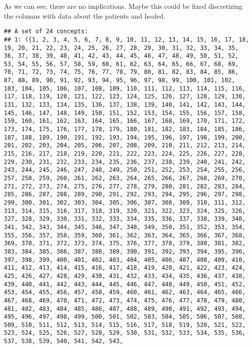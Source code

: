 \documentclass[
]{book}
\newenvironment{Shaded}{\begin{snugshade}}{\end{snugshade}}
\newcommand{\KeywordTok}[1]{\textcolor[rgb]{0.13,0.29,0.53}{\textbf{#1}}}
\newcommand{\NormalTok}[1]{#1}
\newcommand{\OperatorTok}[1]{\textcolor[rgb]{0.81,0.36,0.00}{\textbf{#1}}}
\begin{document}
As we can see, there are no implications. Maybe this could be fixed discretizing the columns with data about the patients and healed.

\begin{Shaded}
\end{Shaded}

\begin{verbatim}
## A set of 24 concepts:
## 1: ({1, 2, 3, 4, 5, 6, 7, 8, 9, 10, 11, 12, 13, 14, 15, 16, 17, 18, 19, 20, 21, 22, 23, 24, 25, 26, 27, 28, 29, 30, 31, 32, 33, 34, 35, 36, 37, 38, 39, 40, 41, 42, 43, 44, 45, 46, 47, 48, 49, 50, 51, 52, 53, 54, 55, 56, 57, 58, 59, 60, 61, 62, 63, 64, 65, 66, 67, 68, 69, 70, 71, 72, 73, 74, 75, 76, 77, 78, 79, 80, 81, 82, 83, 84, 85, 86, 87, 88, 89, 90, 91, 92, 93, 94, 95, 96, 97, 98, 99, 100, 101, 102, 103, 104, 105, 106, 107, 108, 109, 110, 111, 112, 113, 114, 115, 116, 117, 118, 119, 120, 121, 122, 123, 124, 125, 126, 127, 128, 129, 130, 131, 132, 133, 134, 135, 136, 137, 138, 139, 140, 141, 142, 143, 144, 145, 146, 147, 148, 149, 150, 151, 152, 153, 154, 155, 156, 157, 158, 159, 160, 161, 162, 163, 164, 165, 166, 167, 168, 169, 170, 171, 172, 173, 174, 175, 176, 177, 178, 179, 180, 181, 182, 183, 184, 185, 186, 187, 188, 189, 190, 191, 192, 193, 194, 195, 196, 197, 198, 199, 200, 201, 202, 203, 204, 205, 206, 207, 208, 209, 210, 211, 212, 213, 214, 215, 216, 217, 218, 219, 220, 221, 222, 223, 224, 225, 226, 227, 228, 229, 230, 231, 232, 233, 234, 235, 236, 237, 238, 239, 240, 241, 242, 243, 244, 245, 246, 247, 248, 249, 250, 251, 252, 253, 254, 255, 256, 257, 258, 259, 260, 261, 262, 263, 264, 265, 266, 267, 268, 269, 270, 271, 272, 273, 274, 275, 276, 277, 278, 279, 280, 281, 282, 283, 284, 285, 286, 287, 288, 289, 290, 291, 292, 293, 294, 295, 296, 297, 298, 299, 300, 301, 302, 303, 304, 305, 306, 307, 308, 309, 310, 311, 312, 313, 314, 315, 316, 317, 318, 319, 320, 321, 322, 323, 324, 325, 326, 327, 328, 329, 330, 331, 332, 333, 334, 335, 336, 337, 338, 339, 340, 341, 342, 343, 344, 345, 346, 347, 348, 349, 350, 351, 352, 353, 354, 355, 356, 357, 358, 359, 360, 361, 362, 363, 364, 365, 366, 367, 368, 369, 370, 371, 372, 373, 374, 375, 376, 377, 378, 379, 380, 381, 382, 383, 384, 385, 386, 387, 388, 389, 390, 391, 392, 393, 394, 395, 396, 397, 398, 399, 400, 401, 402, 403, 404, 405, 406, 407, 408, 409, 410, 411, 412, 413, 414, 415, 416, 417, 418, 419, 420, 421, 422, 423, 424, 425, 426, 427, 428, 429, 430, 431, 432, 433, 434, 435, 436, 437, 438, 439, 440, 441, 442, 443, 444, 445, 446, 447, 448, 449, 450, 451, 452, 453, 454, 455, 456, 457, 458, 459, 460, 461, 462, 463, 464, 465, 466, 467, 468, 469, 470, 471, 472, 473, 474, 475, 476, 477, 478, 479, 480, 481, 482, 483, 484, 485, 486, 487, 488, 489, 490, 491, 492, 493, 494, 495, 496, 497, 498, 499, 500, 501, 502, 503, 504, 505, 506, 507, 508, 509, 510, 511, 512, 513, 514, 515, 516, 517, 518, 519, 520, 521, 522, 523, 524, 525, 526, 527, 528, 529, 530, 531, 532, 533, 534, 535, 536, 537, 538, 539, 540, 541, 542, 543, 
\end{verbatim}
\end{document}
